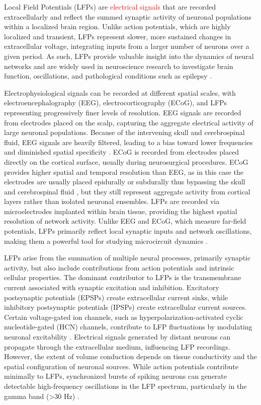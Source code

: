 \documentclass{article}
\begin{document}
Local Field Potentials (LFPs) are \textcolor{red}{electrical signals} that are recorded extracellularly and reflect the summed synaptic activity of neuronal populations within a localized brain region. Unlike action potentials, which are highly localized and transient, LFPs represent slower, more sustained changes in extracellular voltage, integrating inputs from a larger number of neurons over a given period. As such, LFPs provide valuable insight into the dynamics of neural networks and are widely used in neuroscience research to investigate brain function, oscillations, and pathological conditions such as epilepsy \cite{buzsaki2012}.

Electrophysiological signals can be recorded at different spatial scales, with electroencephalography (EEG), electrocorticography (ECoG), and LFPs representing progressively finer levels of resolution. EEG signals are recorded from electrodes placed on the scalp, capturing the aggregate electrical activity of large neuronal populations. Because of the intervening skull and cerebrospinal fluid, EEG signals are heavily filtered, leading to a bias toward lower frequencies and diminished spatial specificity \cite{buzsaki2012, einevoll2022}. ECoG is recorded from electrodes placed directly on the cortical surface, usually during neurosurgical procedures. ECoG provides higher spatial and temporal resolution than EEG, as in this case the electrodes are usually placed epidurally or subdurally thus bypassing the skull and cerebrospinal fluid \cite{moon2024}, but they still represent aggregate activity from cortical layers rather than isolated neuronal ensembles. LFPs are recorded via microelectrodes implanted within brain tissue, providing the highest spatial resolution of network activity. Unlike EEG and ECoG, which measure far-field potentials, LFPs primarily reflect local synaptic inputs and network oscillations, making them a powerful tool for studying microcircuit dynamics \cite{telenczuk2014}.

LFPs arise from the summation of multiple neural processes, primarily synaptic activity, but also include contributions from action potentials and intrinsic cellular properties. The dominant contributor to LFPs is the transmembrane current associated with synaptic excitation and inhibition. Excitatory postsynaptic potentials (EPSPs) create extracellular current sinks, while inhibitory postsynaptic potentials (IPSPs) create extracellular current sources. Certain voltage-gated ion channels, such as hyperpolarization-activated cyclic nucleotide-gated (HCN) channels, contribute to LFP fluctuations by modulating neuronal excitability \cite{sinha2015}. Electrical signals generated by distant neurons can propagate through the extracellular medium, influencing LFP recordings. However, the extent of volume conduction depends on tissue conductivity and the spatial configuration of neuronal sources. While action potentials contribute minimally to LFPs, synchronized bursts of spiking neurons can generate detectable high-frequency oscillations in the LFP spectrum, particularly in the gamma band (>30 Hz) \cite{mcafee2018}.
\end{document}
